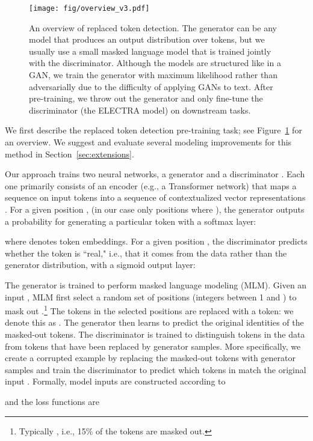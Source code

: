 \documentclass{article}
\newcommand{\alns}[1] {
	
}
\newcommand{\bmx}{\bm{x}^\text{masked}}
\newcommand{\bfx}{\bm{x}^\text{corrupt}}
\newcommand{\bx}{\bm{x}}
\newcommand{\hbx}{\hat{\bm{x}}}
\newcommand{\I}{\bm{m}}
\newcommand{\replace}[3] {
    \textsc{replace}(#1, #2, #3)
}
\begin{document}
\begin{figure}[tb]
\begin{center}
\texttt{[image: fig/overview\_v3.pdf]}
\end{center}
\caption{An overview of replaced token detection. The generator can be any model that produces an output distribution over tokens, but we usually use a small masked language model that is trained jointly with the discriminator.
Although the models are structured like in a GAN, we train the generator with maximum likelihood rather than adversarially due to the difficulty of applying GANs to text.
After pre-training, we throw out the generator and only fine-tune the discriminator (the ELECTRA model) on downstream tasks.
}
\label{fig:overview}
\end{figure}

We first describe the  replaced token detection pre-training task; see Figure~\ref{fig:overview} for an overview.
We suggest and evaluate several modeling improvements for this method in Section~\ref{sec:extensions}.

Our approach trains two neural networks, a generator  and a discriminator .
Each one primarily consists of an encoder (e.g., a Transformer network) that maps a sequence on input tokens  into a sequence of contextualized vector representations
.
For a given position , (in our case only positions where ), 
the generator outputs a probability for generating a particular token  with a softmax layer: 
\alns{
 p_G(x_t | \bx) = \text{exp}\left(e(x_t)^T h_G(\bx)_t\right) / \sum_{x'} \exp\left(e(x')^T h_G(\bx)_t\right)
} 
where  denotes token embeddings. 
For a given position , the discriminator predicts whether the token  is ``real," i.e., that it comes from the data rather than the generator distribution, with a sigmoid output layer: 
\alns{ 
    D(\bx, t) = \text{sigmoid}(w^T h_D(\bx)_t)
}
The generator is trained to perform masked language modeling (MLM). Given an input , MLM first select a random set of positions (integers between 1 and ) to mask out .\footnote{Typically , i.e., 15\% of the tokens are masked out.}
The tokens in the selected positions are replaced with a  token: we denote this as .
The generator then learns to predict the original identities of the masked-out tokens. 
The discriminator is trained to distinguish tokens in the data from tokens that have been replaced by generator samples.
More specifically, we create a corrupted example  by replacing the masked-out tokens with generator samples and train the discriminator to predict which tokens in  match the original input . Formally, model inputs are constructed according to
\alns{
&m_i \sim \text{unif}\{1, n\} \text{ for } i=1 \text{ to } k \hspace{10mm} 
\bmx = \replace{\bx}{\I}{\texttt{[MASK]}} \\
&\hat{x}_i \sim p_G(x_i | \bmx) \text{ for } i \in \I \hspace{10mm}
\bfx = \replace{\bx}{\I}{\hbx} 
}
and the loss functions are
\end{document}
